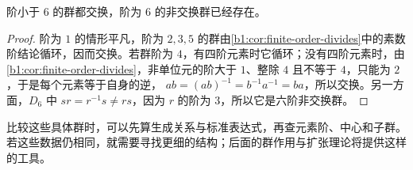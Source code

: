 \begin{proposition}\label{b1:prop:noncommutative-small-order}
	阶小于 \(6\) 的群都交换，阶为 \(6\) 的非交换群已经存在。
\end{proposition}
\begin{proof}
	阶为 \(1\) 的情形平凡，阶为 \(2,3,5\) 的群由\cref{b1:cor:finite-order-divides}中的素数阶结论循环，因而交换。若群阶为 \(4\)，有四阶元素时它循环；没有四阶元素时，由\cref{b1:cor:finite-order-divides}，非单位元的阶大于 \(1\)、整除 \(4\) 且不等于 \(4\)，只能为 \(2\)，于是每个元素等于自身的逆， \(ab=(ab)^{-1}=b^{-1}a^{-1}=ba\)，所以交换。另一方面，\(D_6\) 中 \(sr=r^{-1}s\ne rs\)，因为 \(r\) 的阶为 \(3\)，所以它是六阶非交换群。
\end{proof}

比较这些具体群时，可以先算生成关系与标准表达式，再查元素阶、中心和子群。若这些数据仍相同，就需要寻找更细的结构；后面的群作用与扩张理论将提供这样的工具。
